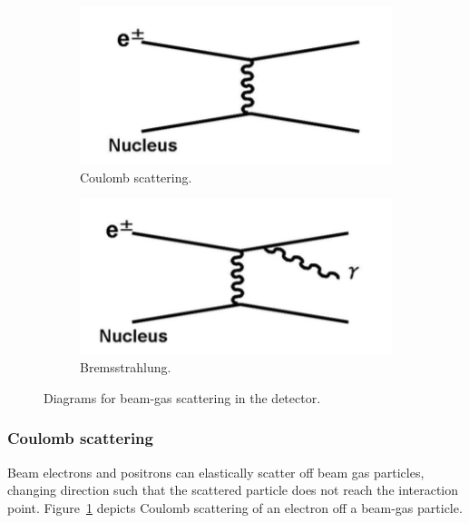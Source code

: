 \documentclass[12pt]{thesis}  %
\begin{document}
  \begin{figure}[h]
        \centering
        \begin{subfigure}[b]{0.475\textwidth}
            \centering
            \includegraphics[width=\textwidth]{images/coulomb-scattering.png}
            \caption[]%
            {{\small Coulomb scattering.}}    
            \label{fig:coulomb scattering}
        \end{subfigure}
        \hfill
        \begin{subfigure}[b]{0.475\textwidth}  
            \centering 
            \includegraphics[width=\textwidth]{images/bremsstrahlung.png}
            \caption[]%
            {{\small Bremsstrahlung.}}    
            \label{fig:bremsstrahlung}
        \end{subfigure}
        \caption[]%
        {{\small Diagrams for beam-gas scattering in the detector.}}
    \end{figure}


\subsubsection{Coulomb scattering}

Beam electrons and positrons can elastically scatter off beam gas particles, changing direction such that the scattered particle does not reach the interaction point. Figure~\ref{fig:coulomb scattering} depicts Coulomb scattering of an electron off a beam-gas particle.
\end{document}
